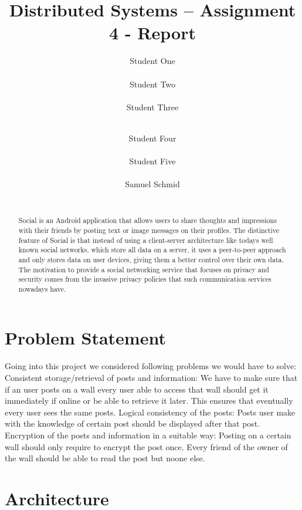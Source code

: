 \documentclass{report}
\title{Distributed Systems -- Assignment 4 - Report}
\author{
%
%
\alignauthor Student One\\
	\affaddr{ETH ID XX-XXX-XXX}\\
	\email{one@student.ethz.ch}
\alignauthor Student Two\\
	\affaddr{ETH ID XX-XXX-XXX}\\
	\email{two@student.ethz.ch}
\alignauthor Student Three\\
	\affaddr{ETH ID XX-XXX-XXX}\\
	\email{three@student.ethz.ch}
\and  %
\alignauthor Student Four\\
 	\affaddr{ETH ID XX-XXX-XXX}\\
 	\email{four@student.ethz.ch}
\alignauthor Student Five\\
 	\affaddr{ETH ID XX-XXX-XXX}\\
 	\email{five@student.ethz.ch}
\alignauthor Samuel Schmid\\
 	\affaddr{ETH ID 10-919-991}\\
 	\email{schmisam@student.ethz.ch}
}
\begin{document}
\maketitle

\begin{abstract}
Social is an Android application that allows users to share thoughts and impressions with their friends by posting text or image messages on their profiles.
The distinctive feature of Social is that instead of using a client-server architecture like todays well known social networks, which store all data on a server, it uses a peer-to-peer approach and only stores data on user devices, giving them a better control over their own data.
The motivation to provide a social networking service that focuses on privacy and security comes from the invasive privacy policies that such communication services nowadays have.
\end{abstract}

\section{Problem Statement}

Going into this project we considered following problems we would have to solve: \newline
Consistent storage/retrieval of posts and information:  \newline
We have to make sure that if an user posts on a wall every user able to access that wall should get it immediately if online or be able to retrieve it later. This ensures that eventually every user sees the same posts.  \newline
Logical consistency of the posts:  \newline
Posts user make with the knowledge of certain post should be displayed after that post.  \newline
Encryption of the posts and information in a suitable way:  \newline
Posting on a certain wall should only require to encrypt the post once. Every friend of the owner of the wall should be able to read the post but noone else. \newline

\section{Architecture}
\end{document}
